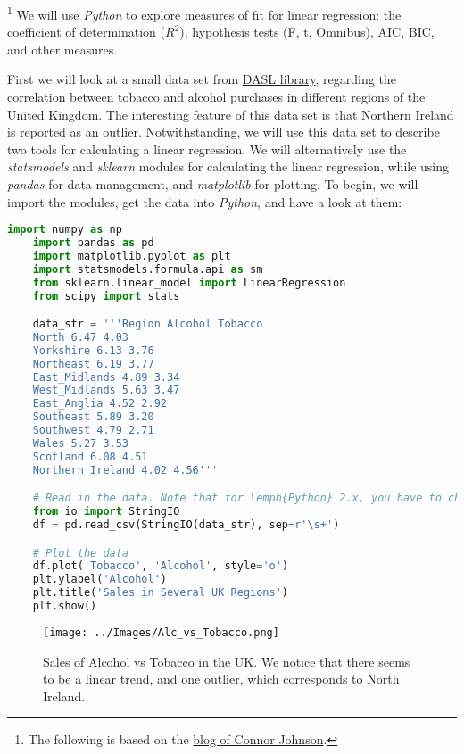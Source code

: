 \footnote{The following is based on the \href{http://connor-johnson.com/2014/02/18/linear-regression-with-python/}{blog of Connor Johnson}.}
We will use \emph{Python} to explore measures of fit for linear regression: the coefficient of determination ($R^2$), hypothesis tests (F, t, Omnibus), AIC, BIC, and other measures.

First we will look at a small data set from \href{http://lib.stat.cmu.edu/DASL/Stories/AlcoholandTobacco.html}{DASL library}, regarding the correlation between tobacco and alcohol purchases in different regions of the United Kingdom. The interesting feature of this data set is that Northern Ireland is reported as an outlier. Notwithstanding, we will use this data set to describe two tools for calculating a linear regression. We will alternatively use the \emph{statsmodels} and \emph{sklearn} modules for calculating the linear regression, while using \emph{pandas} for data management, and \emph{matplotlib} for plotting. To begin, we will import the modules, get the data into \emph{Python}, and have a look at them:

\begin{lstlisting}[language=Python]
    import numpy as np
    import pandas as pd
    import matplotlib.pyplot as plt
    import statsmodels.formula.api as sm
    from sklearn.linear_model import LinearRegression
    from scipy import stats

    data_str = '''Region Alcohol Tobacco
    North 6.47 4.03
    Yorkshire 6.13 3.76
    Northeast 6.19 3.77
    East_Midlands 4.89 3.34
    West_Midlands 5.63 3.47
    East_Anglia 4.52 2.92
    Southeast 5.89 3.20
    Southwest 4.79 2.71
    Wales 5.27 3.53
    Scotland 6.08 4.51
    Northern_Ireland 4.02 4.56'''

    # Read in the data. Note that for \emph{Python} 2.x, you have to change the "import" statement
    from io import StringIO
    df = pd.read_csv(StringIO(data_str), sep=r'\s+')

    # Plot the data
    df.plot('Tobacco', 'Alcohol', style='o')
    plt.ylabel('Alcohol')
    plt.title('Sales in Several UK Regions')
    plt.show()
\end{lstlisting}

\begin{figure}
  \centering
  \texttt{[image: ../Images/Alc\_vs\_Tobacco.png]}\\
  \caption{Sales of Alcohol vs Tobacco in the UK. We notice that there seems to be a linear trend, and one outlier, which corresponds to North Ireland.}
\end{figure}


